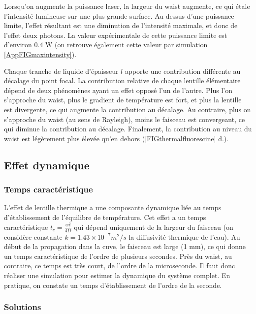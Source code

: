 Lorsqu'on augmente la puissance laser, la largeur du waist augmente, ce qui étale l'intensité lumineuse sur une plus grande surface. Au dessus d'une puissance limite, l'effet résultant est une diminution de l'intensité maximale, et donc de l'effet deux photons. La valeur expérimentale de cette puissance limite est d'environ 0.4 W (on retrouve également cette valeur par simulation \ref{AppFIGmaxintensity}).

Chaque tranche de liquide d'épaisseur $l$ apporte une contribution différente au décalage du point focal. La contribution relative de chaque lentille élémentaire dépend de deux phénomènes ayant un effet opposé l'un de l'autre. Plus l'on s'approche du waist, plus le gradient de température est fort, et plus la lentille est divergente, ce qui augmente la contribution au décalage. Au contraire, plus on s'approche du waist (au sens de Rayleigh), moins le faisceau est convergeant, ce qui diminue la contribution au décalage. Finalement, la contribution au niveau du waist est légèrement plus élevée qu'en dehors (\ref{FIGthermalfluorescine} d.).


\subsection{Effet dynamique}

\subsubsection{Temps caractéristique}

L'effet de lentille thermique a une composante dynamique liée au temps d'établissement de l'équilibre de température. Cet effet a un temps caractéristique $t_c = \frac{w_z^2}{4D}$ qui dépend uniquement de la largeur du faisceau (on considère constante $k = 1.43\times 10^{-7} m^2/s$ la diffusivité thermique de l'eau). Au début de la propagation dans la cuve, le faisceau est large (1 mm), ce qui donne un temps caractéristique de l'ordre de plusieurs secondes. Près du waist, au contraire, ce temps est très court, de l'ordre de la microseconde. Il faut donc réaliser une simulation pour estimer la dynamique du système complet. 
En pratique, on constate un temps d'établissement de l'ordre de la seconde.

\subsubsection{Solutions}\label{solutionseffetthermique}

